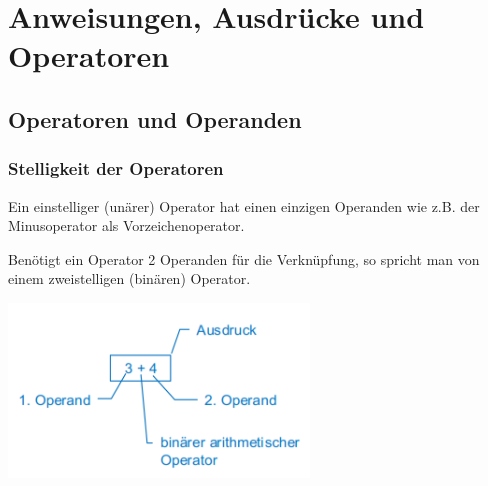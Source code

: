 \section{Anweisungen, Ausdrücke und Operatoren }
	\begin{minipage}[c]{10 cm}
		\subsection{Operatoren und Operanden }
			\subsubsection{Stelligkeit der Operatoren}
				\begin{compactitem}
				 	\item Ein einstelliger (unärer) Operator hat einen einzigen Operanden wie z.B. der Minusoperator als Vorzeichenoperator.
				 	\item Benötigt ein Operator 2 Operanden für die Verknüpfung, so spricht man von einem zweistelligen (binären) Operator.\\ 
				\end{compactitem}
	\end{minipage}
	\hspace*{1cm}
	\begin{minipage}[c]{9 cm}
		\includegraphics[width=0.6\textwidth]{pics/binaerer_Operator.png}	
	\end{minipage}
		
